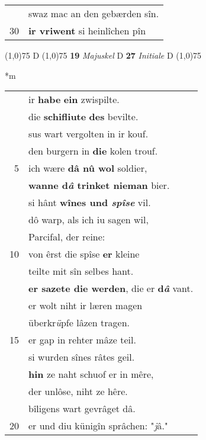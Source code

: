 \documentclass[8pt,a4paper,notitlepage]{article}
\begin{document}
\begin{table}[ht]
\begin{minipage}[t]{0.5\linewidth}
\begin{tabular}{rl}
 & swaz mac an den gebærden sîn.\\ 
30 & \textbf{ir vriwent} si heinlîchen pîn\\ 
\end{tabular}
\scriptsize
\line(1,0){75} \newline
D \newline
\line(1,0){75} \newline
\textbf{19} \textit{Majuskel} D  \textbf{27} \textit{Initiale} D  \newline
\line(1,0){75} \newline
\newline
\end{minipage}
\hspace{0.5cm}
\begin{minipage}[t]{0.5\linewidth}
\small
\begin{center}*m
\end{center}
\begin{tabular}{rl}
 & ir \textbf{habe} \textbf{ein} zwispilte.\\ 
 & die \textbf{schifliute} \textbf{des} bevilte.\\ 
 & sus wart vergolten in ir kouf.\\ 
 & den burgern in \textbf{die} kolen trouf.\\ 
5 & ich wære \textbf{dâ nû wol} soldier,\\ 
 & \textbf{wanne d\textit{â} trinket nieman} bier.\\ 
 & si hânt \textbf{wînes und \textit{spîse}} vil.\\ 
 & dô warp, als ich iu sagen wil,\\ 
 & Parcifal, der reine:\\ 
10 & von êrst die spîse \textbf{er} kleine\\ 
 & teilte mit sîn selbes hant.\\ 
 & \textbf{er sazete die werden}, die er \textbf{d\textit{â}} vant.\\ 
 & er wolt niht ir læren magen\\ 
 & überkr\textit{ü}pfe lâzen tragen.\\ 
15 & er gap in rehter mâze teil.\\ 
 & si wurden sînes râtes geil.\\ 
 & \textbf{hin} ze naht schuof er in mêre,\\ 
 & der unlôse, niht ze hêre.\\ 
 & bîligens wart gevrâget dâ.\\ 
20 & er und diu künigîn sprâchen: "\textit{j}â."\\ 

\end{tabular}
\end{minipage}
\end{table}
\end{document}
